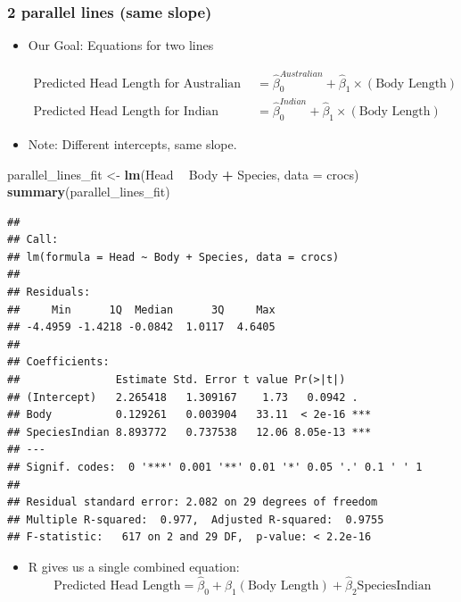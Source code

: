 \documentclass[14pt]{extarticle}
\newenvironment{Shaded}{\begin{snugshade}}{\end{snugshade}}
\newcommand{\KeywordTok}[1]{\textcolor[rgb]{0.13,0.29,0.53}{\textbf{#1}}}
\newcommand{\DataTypeTok}[1]{\textcolor[rgb]{0.13,0.29,0.53}{#1}}
\newcommand{\StringTok}[1]{\textcolor[rgb]{0.31,0.60,0.02}{#1}}
\newcommand{\OperatorTok}[1]{\textcolor[rgb]{0.81,0.36,0.00}{\textbf{#1}}}
\newcommand{\NormalTok}[1]{#1}
\providecommand{\tightlist}{%
  \setlength{\itemsep}{0pt}\setlength{\parskip}{0pt}}
\begin{document}
\newpage

\subsubsection{2 parallel lines (same
slope)}\label{parallel-lines-same-slope}

\begin{itemize}
\tightlist
\item
  Our Goal: Equations for two lines

  \begin{align*}
  \text{Predicted Head Length for Australian Crocs } &= \hat{\beta}_0^{Australian} + \hat{\beta}_{1} \times (\text{Body Length}) \\
  \text{Predicted Head Length for Indian Crocs } &= \hat{\beta}_0^{Indian} + \hat{\beta}_{1} \times (\text{Body Length})
  \end{align*}
\item
  Note: Different intercepts, same slope.
\end{itemize}

\begin{Shaded}
\begin{Highlighting}[]
\NormalTok{parallel_lines_fit <-}\StringTok{ }\KeywordTok{lm}\NormalTok{(Head }\OperatorTok{~}\StringTok{ }\NormalTok{Body }\OperatorTok{+}\StringTok{ }\NormalTok{Species, }\DataTypeTok{data =}\NormalTok{ crocs)}
\KeywordTok{summary}\NormalTok{(parallel_lines_fit)}
\end{Highlighting}
\end{Shaded}

\begin{verbatim}
## 
## Call:
## lm(formula = Head ~ Body + Species, data = crocs)
## 
## Residuals:
##     Min      1Q  Median      3Q     Max 
## -4.4959 -1.4218 -0.0842  1.0117  4.6405 
## 
## Coefficients:
##               Estimate Std. Error t value Pr(>|t|)    
## (Intercept)   2.265418   1.309167    1.73   0.0942 .  
## Body          0.129261   0.003904   33.11  < 2e-16 ***
## SpeciesIndian 8.893772   0.737538   12.06 8.05e-13 ***
## ---
## Signif. codes:  0 '***' 0.001 '**' 0.01 '*' 0.05 '.' 0.1 ' ' 1
## 
## Residual standard error: 2.082 on 29 degrees of freedom
## Multiple R-squared:  0.977,  Adjusted R-squared:  0.9755 
## F-statistic:   617 on 2 and 29 DF,  p-value: < 2.2e-16
\end{verbatim}

\begin{itemize}
\tightlist
\item
  R gives us a single combined equation:
  \[\text{Predicted Head Length} = \hat{\beta}_0 + \hat{\beta}_{1} (\text{Body Length}) + \hat{\beta}_2 \text{SpeciesIndian}\]
\end{itemize}
\end{document}
